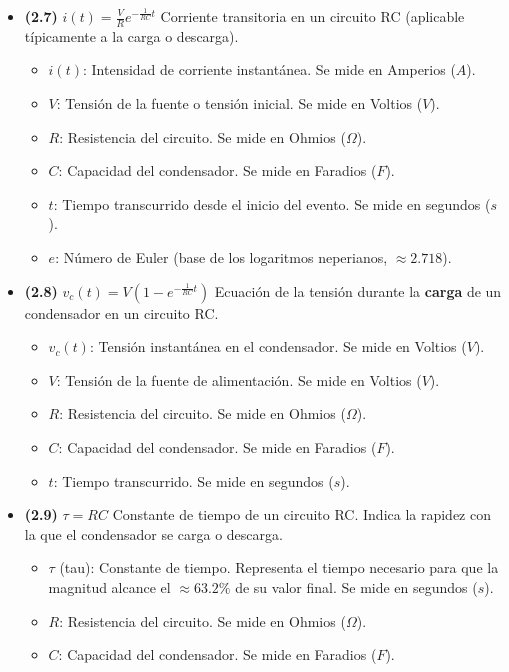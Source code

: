 \documentclass{article}
\begin{document}
\begin{itemize}
				\item \textbf{(2.7)} $\boxed{i(t)=\frac{V}{R}e^{-\frac{1}{RC}t}}$ Corriente transitoria en un circuito RC (aplicable típicamente a la carga o descarga).
					\begin{itemize}
						\item $i(t)$: Intensidad de corriente instantánea. Se mide en Amperios ($A$).
						\item $V$: Tensión de la fuente o tensión inicial. Se mide en Voltios ($V$).
						\item $R$: Resistencia del circuito. Se mide en Ohmios ($\Omega$).
						\item $C$: Capacidad del condensador. Se mide en Faradios ($F$).
						\item $t$: Tiempo transcurrido desde el inicio del evento. Se mide en segundos ($s$).
						\item $e$: Número de Euler (base de los logaritmos neperianos, $\approx 2.718$).
					\end{itemize}

				\item \textbf{(2.8)} $\boxed{v_c(t)=V(1-e^{-\frac{1}{RC}t})}$ Ecuación de la tensión durante la \textbf{carga} de un condensador en un circuito RC.
					\begin{itemize}
						\item $v_c(t)$: Tensión instantánea en el condensador. Se mide en Voltios ($V$).
						\item $V$: Tensión de la fuente de alimentación. Se mide en Voltios ($V$).
						\item $R$: Resistencia del circuito. Se mide en Ohmios ($\Omega$).
						\item $C$: Capacidad del condensador. Se mide en Faradios ($F$).
						\item $t$: Tiempo transcurrido. Se mide en segundos ($s$).
					\end{itemize}

				\item \textbf{(2.9)} $\boxed{\tau=RC}$ Constante de tiempo de un circuito RC. Indica la rapidez con la que el condensador se carga o descarga.
					\begin{itemize}
						\item $\tau$ (tau): Constante de tiempo. Representa el tiempo necesario para que la magnitud alcance el $\approx 63.2\%$ de su valor final. Se mide en segundos ($s$).
						\item $R$: Resistencia del circuito. Se mide en Ohmios ($\Omega$).
						\item $C$: Capacidad del condensador. Se mide en Faradios ($F$).
					\end{itemize}


\end{itemize}
\end{document}
